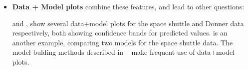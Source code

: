 \begin{itemize}
    \item \textbf{Data + Model plots} combine these features, and lead to other questions:

     and  , 
    show several data+model plots for the space shuttle and Donner data respectively,
    both showing confidence bands for predicted values.
     is an another example, comparing two models for the space shuttle data.
    The model-bulding methods described in -- make frequent
    use of data+model plots.
\end{itemize}